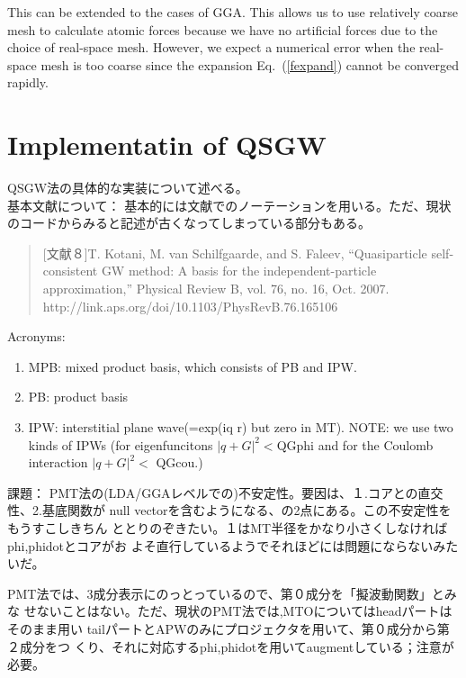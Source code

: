 \documentclass[a4paper,10pt,aip,onecolumn,amsmath,amssymb,floatfix,rmp]{revtex4-1}
\newcommand{\req}[1]{\mbox{Eq.~\!(\ref{#1})}}
\begin{document}
This can be extended to the cases of GGA. 
This allows us to use relatively coarse mesh to calculate 
atomic forces because we have no artificial forces due to the choice 
of real-space mesh. However, we expect a numerical error when the real-space
mesh is too coarse since the expansion \req{fexpand} cannot be
converged rapidly.


\section{Implementatin of QSGW}
\label{sec:qsgwformalism}
QSGW法の具体的な実装について述べる。\\

\noindent 基本文献について：
基本的には文献\cite{kotani07a}でのノーテーションを用いる。ただ、現状のコードからみると記述が古くなってしまっている部分もある。
\begin{quote}
[文献８]T. Kotani, M. van Schilfgaarde, and S. Faleev, “Quasiparticle
self-consistent GW method: 
A basis for the independent-particle approximation,” Physical Review B, vol. 76, no. 16, Oct. 2007.
http://link.aps.org/doi/10.1103/PhysRevB.76.165106
\end{quote}

\noindent Acronyms:
\begin{enumerate}
\item[]
MPB: mixed product basis, which consists of PB and IPW.
\item[]
PB: product basis
\item[]
IPW: interstitial plane wave(=exp(iq r) but zero in MT). NOTE: we use
       two kinds of IPWs (for eigenfuncitons $|q+G|^2<$QGphi and for
       the Coulomb interaction $|q+G|^2<$ QGcou.)
\end{enumerate}

\noindent 課題：
PMT法の(LDA/GGAレベルでの)不安定性。要因は、１.コアとの直交性、2.基底関数が
null vectorを含むようになる、の2点にある。この不安定性をもうすこしきちん
ととりのぞきたい。１はMT半径をかなり小さくしなければphi,phidotとコアがお
よそ直行しているようでそれほどには問題にならないみたいだ。

PMT法では、3成分表示にのっとっているので、第０成分を「擬波動関数」とみな
せないことはない。ただ、現状のPMT法では,MTOについてはheadパートはそのまま用い
tailパートとAPWのみにプロジェクタを用いて、第０成分から第２成分をつ
くり、それに対応するphi,phidotを用いてaugmentしている；注意が必要。
\end{document}
